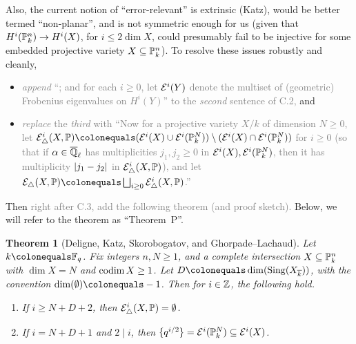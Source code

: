 \documentclass[12pt]{article}
\begin{document}
\begin{itemize}
    Also, the current notion of ``error-relevant'' is extrinsic (Katz),
    would be better termed ``non-planar'',
    and is not symmetric enough for us (given that $H^i(\mathbb{P}^n_k)\to H^i(X)$, for $i\leq 2\dim{X}$, could presumably fail to be injective for some embedded projective variety $X\subseteq \mathbb{P}^n_k$).
    To resolve these issues robustly and cleanly,
    \begin{itemize}
        \item \textcolor{gray}{\emph{append} ``; and for each $i\geq 0$, let $\mathcal{E}^i(Y)$ denote the multiset of (geometric) Frobenius eigenvalues on $H^i(Y)$'' to the \emph{second} sentence of C.2,}
        and
        \item \textcolor{gray}{\emph{replace} the \emph{third} with
        ``Now for a projective variety $X/k$ of dimension $N\geq 0$,
        let $\mcal{E}^i_{\triangle}(X,\PP)\defeq (\mcal{E}^i(X)\cup \mcal{E}^i(\PP^N_k))\setminus (\mcal{E}^i(X)\cap \mcal{E}^i(\PP^N_k))$ for $i\geq 0$
        (so that if $\alpha\in \overline{\mathbb{Q}}_\ell$ has multiplicities $j_1,j_2\geq 0$ in $\mathcal{E}^i(X),\mathcal{E}^i(\mathbb{P}^N_k)$, then it has multiplicity $\lvert j_1-j_2 \rvert$ in $\mathcal{E}^i_{\triangle}(X,\mathbb{P})$),
        and let $\mcal{E}_{\triangle}(X,\PP)\defeq \bigsqcup_{i\geq 0}\mcal{E}^i_{\triangle}(X,\PP)$.''}
    \end{itemize}
    Then \textcolor{gray}{right after C.3, add the following theorem (and proof sketch).}
    Below, we will refer to the theorem as ``Theorem~P''.
    \theoremstyle{plain}
    \newtheorem*{theorem*}{Theorem}
    \begin{theorem*}
    [Deligne, Katz, Skorobogatov, and Ghorpade--Lachaud]
    \label{THM:general-perversity-result}
    Let $k\defeq \FF_q$.
    Fix integers $n,N\geq 1$,
    and a complete intersection $X\subseteq \mathbb{P}^n_k$ with $\dim{X} = N$ and $\operatorname{codim}{X}\geq 1$.
    Let $D\defeq \dim(\map{Sing}(X_{\ol{k}}))$, with the convention $\dim(\emptyset)\defeq -1$.
    Then for $i\in \mathbb{Z}$, the following hold.
    \begin{enumerate}
        \item If $i\geq N+D+2$, then $\mathcal{E}^i_{\triangle}(X,\mathbb{P}) = \emptyset$.
        
        \item If $i = N+D+1$ and $2\mid i$, then $\{q^{i/2}\} = \mathcal{E}^i(\mathbb{P}^{N}_k)\subseteq \mathcal{E}^i(X)$.
    \end{enumerate}
    \end{theorem*}
    
    

\end{itemize}
\end{document}
